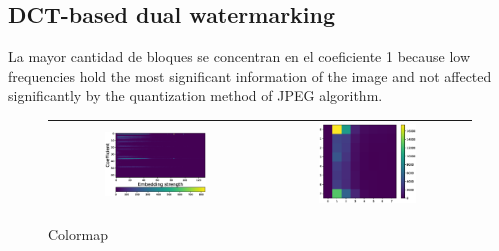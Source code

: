\documentclass[runningheads]{llncs}
\begin{document}
\subsection{DCT-based dual watermarking}
La mayor cantidad de bloques se concentran en el coeficiente 1 because low frequencies hold
the most significant information of the image and not affected significantly by the quantization method of JPEG algorithm.
\begin{figure}[H]
	\begin{center}
		\begin{tabular}{|c|c|}\hline
			\includegraphics[width=0.5\textwidth]{colormapDCT.eps}
			&\includegraphics[width=0.5\textwidth]{coefDCT.eps}\\\hline
		\end{tabular}
	\end{center}
	\caption{Colormap}
	\label{colormapDCT}
\end{figure}
\end{document}
